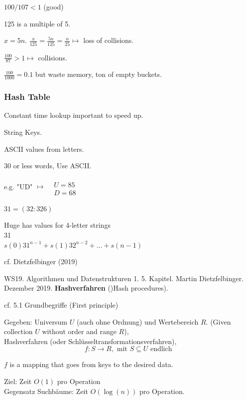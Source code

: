 \documentclass[10pt]{amsart}
\begin{document}
\begin{multicols*}{2}
$100/107 < 1$ (good)

125 is a multiple of 5.

$x=5n$. $\frac{x}{125} = \frac{5n}{125} = \frac{n}{25} \mapsto $ loss of collisions.

$\frac{100}{87} > 1 \mapsto$ collisions.

$\frac{100}{1000} = 0.1$ but waste memory, ton of empty buckets.

\subsubsection{Hash Table}

Constant time lookup important to speed up.

String Keys.

ASCII values from letters.

30 or less words, Use ASCII. 

e.g. "UD" $\mapsto \begin{aligned} & \quad \\
& U = 85 \\
& D = 68 \end{aligned}$ 

$31 = (32 : 326)$ 

Huge has values for 4-letter strings \\
31 \\
$s(0) 31^{n-1} + s(1) 32^{n-2} + \dots + s(n-1)$

cf. Dietzfelbinger (2019) \cite{Diet2019}

WS19. Algorithmen und Datenstrukturen 1. 5. Kapitel. Martin Dietzfelbinger. Dezember 2019. \textbf{Hashverfahren} ()Hash procedures).

cf. 5.1 Grundbegriffe (First principle) \cite{Diet2019}

Gegeben: Universum $U$ (auch ohne Ordnung) und Wertebereich $R$. (Given collection $U$ without order and range $R$), \\
Hashverfahren (oder Schl\"{u}sseltransformationsverfahren),
\begin{equation}
f:S \to R, \text{ mit } S \subseteq U \text{ endlich }
\end{equation}

$f$ is a mapping that goes from keys to the desired data.

Ziel: Zeit $O(1)$ pro Operation \\

Gegensatz Suchb\"{a}ume: Zeit $O(\log{(n)})$ pro Operation.


\end{multicols*}
\end{document}
